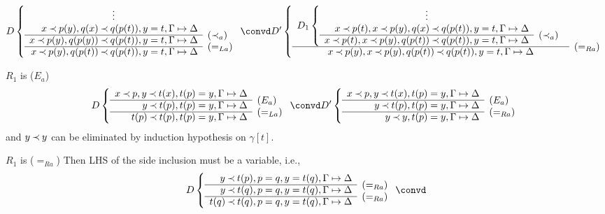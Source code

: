 \begin{PROOF}
\begin{LS}
\begin{LSA}
\begin{LSB}
\[ D \left \{ \begin{array}{rl}
\multicolumn{1}{c}{\vdots} \\ 
x\Incl p(y), q(x)\Incl q(p(t)), y=t, \GSD \\ \cline{1-1}
x\Incl p(y), q(p(y))\Incl q(p(t)), y=t, \GSD & \rabove{(\Incl_a)} \\ \cline{1-1}
x\Incl p(y), q(p(t))\Incl q(p(t)), y=t, \GSD & \rabove{(=_{La})} \end{array} \right
. \convd
 D' \left \{ \begin{array}{cl} D_1 \left \{ \begin{array}{rl}
\multicolumn{1}{c}{\vdots} \\ 
x\Incl p(t), x\Incl p(y), q(x)\Incl q(p(t)), y=t, \GSD \\ \cline{1-1}
x\Incl p(t), x\Incl p(y), q(p(t))\Incl q(p(t)), y=t, \GSD & \rabove{(\Incl_a)} \end{array}
\right . \\ \cline{1-1}
x\Incl p(y), x\Incl p(y), q(p(t))\Incl q(p(t)), y=t, \GSD & \rabove{(=_{Ra})} \end{array} \right
.\]
\end{LSB}
%
\item $R_1$ is ($E_a$)
\[ D \left \{ \begin{array}{rl}
x\Incl p, y\Incl t(x), t(p)=y, \GSD \\ \cline{1-1}
y\Incl t(p), t(p)=y, \GSD  & \rabove{(E_a)} \\ \cline{1-1}
t(p)\Incl t(p), t(p)=y, \GSD  & \rabove{(=_{La})} \end{array} \right. \convd
 D' \left \{ \begin{array}{rl}
x\Incl p, y\Incl t(x), t(p)=y, \GSD \\ \cline{1-1}
y\Incl t(p), t(p)=y, \GSD  & \rabove{(E_a)} \\ \cline{1-1}
y\Incl y, t(p)=y, \GSD  & \rabove{(=_{Ra})} \end{array} \right . \]
and $y\mathbin{\prec} y$ can be eliminated by induction hypothesis on $\gamma[t]$.
%
\item $R_1$ is ($=_{Ra}$) Then LHS of the side inclusion must be a variable,
i.e., 
\[ D \left \{ \begin{array}{rl}
y\Incl t(p), p=q, y=t(q), \GSD \\ \cline{1-1}
y\Incl t(q), p=q, y=t(q), \GSD & \rabove{(=_{Ra})} \\ \cline{1-1}
t(q)\Incl t(q), p=q, y=t(q), \GSD & \rabove{(=_{Ra})} \end{array} \right . \convd
\]
\end{LSA}
\end{LS}
\end{PROOF}
